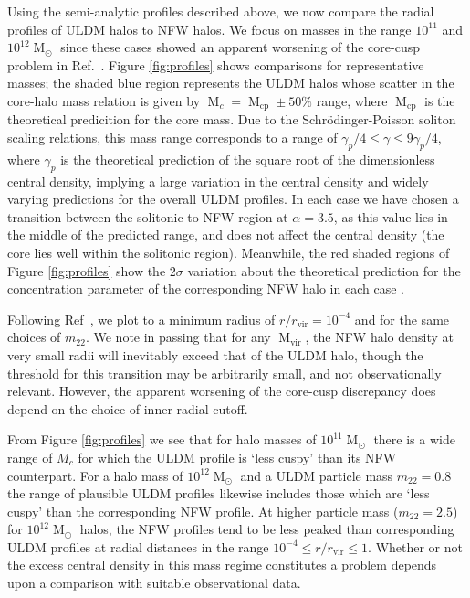 \documentclass{pasa}%
\begin{document}
Using the semi-analytic profiles described above, we now compare the radial profiles of ULDM halos to NFW halos. We focus on masses in the range $10^{11}$ and $10^{12} \operatorname{M}_{\odot}$ since these cases showed an apparent worsening of the core-cusp problem in Ref.~\cite{Robles:2018fur}. Figure \ref{fig:profiles} shows comparisons for representative masses; the shaded blue region represents the ULDM halos whose scatter in the core-halo mass relation is given by $\operatorname{M}_c = \operatorname{M}_{\mathrm{cp}} \pm 50 \% $ range, where $\operatorname{M}_{\mathrm{cp}}$ is the theoretical predicition for the core mass. Due to the  Schr{\"o}dinger-Poisson soliton scaling relations, this mass range corresponds to a range of $ \gamma_p /4 \leq \gamma \leq 9\gamma_p/4$, where $\gamma_p$ is the theoretical prediction of the square root of the dimensionless central density, implying a large variation in the central density and widely varying predictions for the overall ULDM profiles. In each case we have chosen a transition between the solitonic to NFW region at $\alpha = 3.5$, as this value lies in the middle of the predicted range, and does not affect the central density (the core lies well within the solitonic region). Meanwhile, the red shaded regions of Figure \ref{fig:profiles} show the $2\sigma$ variation about the theoretical prediction for the concentration parameter of the corresponding NFW halo in each case \cite{Maccio:2008pcd}. 



Following Ref~\cite{Robles:2018fur}, we plot to a minimum radius of $r/r_{\mathrm{vir}} = 10^{-4}$ and for the same choices of $m_{22}$. We note in passing that for any $\operatorname{M}_{\mathrm{vir}}$, the NFW halo density at very small radii will inevitably exceed that of the ULDM halo, though the threshold for this transition may be arbitrarily small, and not observationally relevant. However, the apparent worsening of the core-cusp discrepancy does depend on the choice of inner radial cutoff.

From Figure \ref{fig:profiles} we see that for halo masses of $10^{11}\operatorname{M}_{\odot}$ there is a wide range of $M_c$ for which the ULDM profile is `less cuspy' than its NFW counterpart. For a halo mass of $10^{12}\operatorname{M}_{\odot}$ and a ULDM particle mass $m_{22}=0.8$ the range of plausible ULDM profiles likewise includes those which are `less cuspy' than the corresponding NFW profile. At higher particle mass ($m_{22}=2.5$) for $10^{12}\operatorname{M}_{\odot}$ halos, the NFW profiles tend to be less peaked than corresponding ULDM profiles at radial distances in  the range $10^{-4}\leq r/r_{\mathrm{vir}} \leq 1$. Whether or not the excess central density in this mass regime constitutes a problem depends upon a comparison with suitable observational data. 
\end{document}
